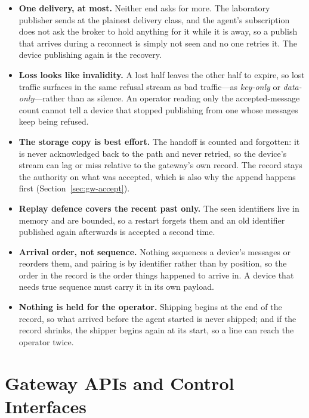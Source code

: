 \documentclass[12pt,a4paper]{report}
\begin{document}
\begin{itemize}
    \item \textbf{One delivery, at most.}
    Neither end asks for more. The laboratory publisher sends at the
    plainest delivery class, and the agent's subscription does not ask
    the broker to hold anything for it while it is away, so a publish
    that arrives during a reconnect is simply not seen and no one
    retries it. The device publishing again is the recovery.
    \item \textbf{Loss looks like invalidity.}
    A lost half leaves the other half to expire, so lost traffic
    surfaces in the same refusal stream as bad traffic---as
    \emph{key-only} or \emph{data-only}---rather than as silence. An
    operator reading only the accepted-message count cannot tell a
    device that stopped publishing from one whose messages keep being
    refused.
    \item \textbf{The storage copy is best effort.}
    The handoff is counted and forgotten: it is never acknowledged back
    to the path and never retried, so the device's stream can lag or
    miss relative to the gateway's own record. The record stays the
    authority on what was accepted, which is also why the append happens
    first (Section~\ref{sec:gw-accept}).
    \item \textbf{Replay defence covers the recent past only.}
    The seen identifiers live in memory and are bounded, so a restart
    forgets them and an old identifier published again afterwards is
    accepted a second time.
    \item \textbf{Arrival order, not sequence.}
    Nothing sequences a device's messages or reorders them, and pairing
    is by identifier rather than by position, so the order in the
    record is the order things happened to arrive in. A device that
    needs true sequence must carry it in its own payload.
    \item \textbf{Nothing is held for the operator.}
    Shipping begins at the end of the record, so what arrived before
    the agent started is never shipped; and if the record shrinks, the
    shipper begins again at its start, so a line can reach the
    operator twice.
\end{itemize}


\section{Gateway APIs and Control Interfaces}
\label{sec:gateway-apis}
\end{document}
